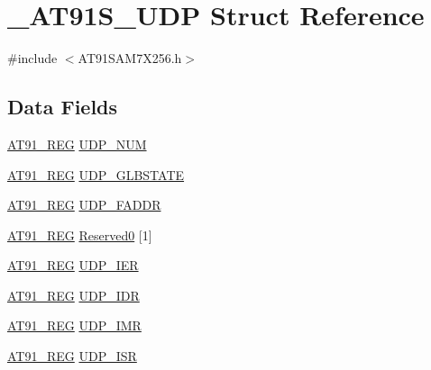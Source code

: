 \hypertarget{struct__AT91S__UDP}{\section{\-\_\-\-A\-T91\-S\-\_\-\-U\-D\-P Struct Reference}
\label{struct__AT91S__UDP}
}


{\ttfamily \#include $<$A\-T91\-S\-A\-M7\-X256.\-h$>$}

\subsection*{Data Fields}
\begin{DoxyCompactItemize}
\item 
\hyperlink{GCC_2ARM7__AT91SAM7S_2AT91SAM7X256_8h_a712ad5a1ac1bd02f3e95a7526c283ce1}{A\-T91\-\_\-\-R\-E\-G} \hyperlink{struct__AT91S__UDP_adc10dbeb36dd030a78d80a0f2f4e1f5c}{U\-D\-P\-\_\-\-N\-U\-M}
\item 
\hyperlink{GCC_2ARM7__AT91SAM7S_2AT91SAM7X256_8h_a712ad5a1ac1bd02f3e95a7526c283ce1}{A\-T91\-\_\-\-R\-E\-G} \hyperlink{struct__AT91S__UDP_a56f35ef281d58bbdde56a5a38750fc2e}{U\-D\-P\-\_\-\-G\-L\-B\-S\-T\-A\-T\-E}
\item 
\hyperlink{GCC_2ARM7__AT91SAM7S_2AT91SAM7X256_8h_a712ad5a1ac1bd02f3e95a7526c283ce1}{A\-T91\-\_\-\-R\-E\-G} \hyperlink{struct__AT91S__UDP_ab2436c0f24250cfc5f3d5b4cc63b62b9}{U\-D\-P\-\_\-\-F\-A\-D\-D\-R}
\item 
\hyperlink{GCC_2ARM7__AT91SAM7S_2AT91SAM7X256_8h_a712ad5a1ac1bd02f3e95a7526c283ce1}{A\-T91\-\_\-\-R\-E\-G} \hyperlink{struct__AT91S__UDP_a21ec9d439f9a93d433e51086767e9027}{Reserved0} \mbox{[}1\mbox{]}
\item 
\hyperlink{GCC_2ARM7__AT91SAM7S_2AT91SAM7X256_8h_a712ad5a1ac1bd02f3e95a7526c283ce1}{A\-T91\-\_\-\-R\-E\-G} \hyperlink{struct__AT91S__UDP_afd91ae40c2301d69f3518adcbddcbd1e}{U\-D\-P\-\_\-\-I\-E\-R}
\item 
\hyperlink{GCC_2ARM7__AT91SAM7S_2AT91SAM7X256_8h_a712ad5a1ac1bd02f3e95a7526c283ce1}{A\-T91\-\_\-\-R\-E\-G} \hyperlink{struct__AT91S__UDP_a5487e1dc226d511f8fe09f440ad663b7}{U\-D\-P\-\_\-\-I\-D\-R}
\item 
\hyperlink{GCC_2ARM7__AT91SAM7S_2AT91SAM7X256_8h_a712ad5a1ac1bd02f3e95a7526c283ce1}{A\-T91\-\_\-\-R\-E\-G} \hyperlink{struct__AT91S__UDP_adeaa26682a0a229b8560074ce9030351}{U\-D\-P\-\_\-\-I\-M\-R}
\item 
\hyperlink{GCC_2ARM7__AT91SAM7S_2AT91SAM7X256_8h_a712ad5a1ac1bd02f3e95a7526c283ce1}{A\-T91\-\_\-\-R\-E\-G} \hyperlink{struct__AT91S__UDP_a83b861d5cf938b16d0f9a2b06ad428d9}{U\-D\-P\-\_\-\-I\-S\-R}

\end{DoxyCompactItemize}
